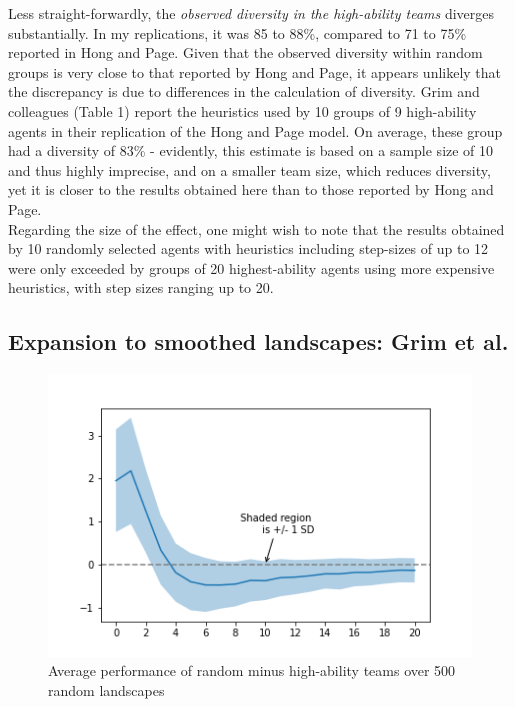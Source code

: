 Less straight-forwardly, the \textit{observed diversity in the high-ability teams} diverges substantially. In my replications, it was 85 to 88\%, compared to 71 to 75\% reported in Hong and Page. Given that the observed diversity within random groups is very close to that reported by Hong and Page, it appears unlikely that the discrepancy is due to differences in the calculation of diversity. Grim and colleagues (Table 1) report the heuristics used by 10 groups of 9 high-ability agents in their replication of the Hong and Page model. On average, these group had a diversity of 83\% - evidently, this estimate is based on a sample size of 10 and thus highly imprecise, and on a smaller team size, which reduces diversity, yet it is closer to the results obtained here than to those reported by Hong and Page.  \\

Regarding the size of the effect, one might wish to note that the results obtained by 10 randomly selected agents with heuristics including step-sizes of up to 12 were only exceeded by groups of 20 highest-ability agents using more expensive heuristics, with step sizes ranging up to 20. 
    
\subsection{Expansion to smoothed landscapes: Grim et al.}

\begin{figure}
    \includegraphics[width=\linewidth]{Fig2.png}
    \caption{Average performance of random minus high-ability teams over 500 random landscapes}
    \label{fig:Grim2}
  \end{figure}
 
